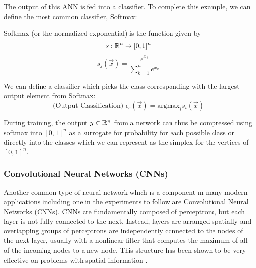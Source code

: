 {
}



The output of this ANN is fed into a classifier. To complete this
example, we can define the most common classifier, Softmax:


\begin{definition}{Softmax (or the normalized exponential) is the function given by}
\[s : \mathbb{R}^n \to [0,1]^n\]
\[s_j(\vec x) = \frac{e^{x_j}}{\sum_{k = 1}^n e^{x_k}}\]
\end{definition}

\begin{definition}{We can define a classifier which picks the class corresponding with the largest output element from Softmax: }
\[\text{(Output Classification)  }   c_s(\vec x) = \text{argmax}_{i} s_i(\vec{x})\]
\end{definition}
During training, the output $y \in \mathbb{R}^n$ from a network can thus be compressed using softmax into $[0,1]^n$ as a surrogate for probability for each possible class or directly into the classes which we can represent as the simplex for the vertices of $[0,1]^n$. 

\cite{Bishop:2006:PRM:1162264}

\subsubsection{Convolutional Neural Networks (CNNs)}\label{cnn}

Another common type of neural network which is a component in many modern applications including one in the experiments to follow are Convolutional Neural Networks (CNNs). CNNs are fundamentally composed of
perceptrons, but each layer is not fully connected to the
next. Instead, layers are arranged spatially and overlapping groups of perceptrons are independently connected to the nodes of the next layer, usually with a nonlinear filter that computes the maximum of all of the incoming nodes to a new node. This structure has been shown to be very effective on problems with spatial information \cite{lecun1995convolutional}. 


